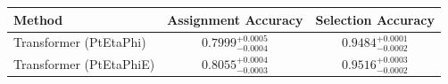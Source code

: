     \begin{tabular}{lcc}
        \toprule
        Method & Assignment Accuracy & Selection Accuracy \\
        \midrule
        Transformer (PtEtaPhi) & $0.7999_{-0.0004}^{+0.0005}$ & $0.9484_{-0.0002}^{+0.0001}$ \\
        Transformer (PtEtaPhiE) & $0.8055_{-0.0003}^{+0.0004}$ & $0.9516_{-0.0002}^{+0.0003}$ \\
        \bottomrule
    \end{tabular}